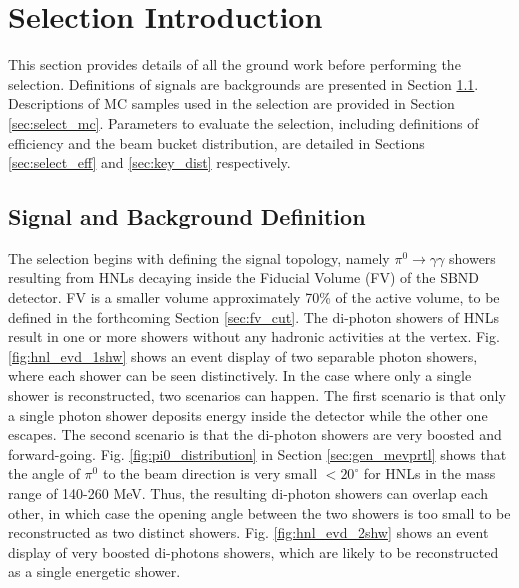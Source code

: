 
\section{Selection Introduction}
\label{sec:select_intro}

This section provides details of all the ground work before performing the selection. 
Definitions of signals are backgrounds are presented in Section \ref{sec:sig_bkg_def}.
Descriptions of MC samples used in the selection are provided in Section \ref{sec:select_mc}.
Parameters to evaluate the selection, including definitions of efficiency and the beam bucket distribution, are detailed in Sections \ref{sec:select_eff} and \ref{sec:key_dist} respectively.

\subsection{Signal and Background Definition}
\label{sec:sig_bkg_def}

The selection begins with defining the signal topology, namely $\pi^0 \rightarrow \gamma\gamma$ showers resulting from HNLs decaying inside the Fiducial Volume (FV) of the SBND detector.
FV is a smaller volume approximately 70\% of the active volume, to be defined in the forthcoming Section \ref{sec:fv_cut}.
The di-photon showers of HNLs result in one or more showers without any hadronic activities at the vertex.
Fig. \ref{fig:hnl_evd_1shw} shows an event display of two separable photon showers, where each shower can be seen distinctively.
In the case where only a single shower is reconstructed, two scenarios can happen.
The first scenario is that only a single photon shower deposits energy inside the detector while the other one escapes.
The second scenario is that the di-photon showers are very boosted and forward-going.
Fig. \ref{fig:pi0_distribution} in Section \ref{sec:gen_mevprtl} shows that the angle of $\pi^0$ to the beam direction is very small $< 20^\circ$ for HNLs in the mass range of 140-260 MeV.
Thus, the resulting di-photon showers can overlap each other, in which case the opening angle between the two showers is too small to be reconstructed as two distinct showers. 
Fig. \ref{fig:hnl_evd_2shw} shows an event display of very boosted di-photons showers, which are likely to be reconstructed as a single energetic shower.

